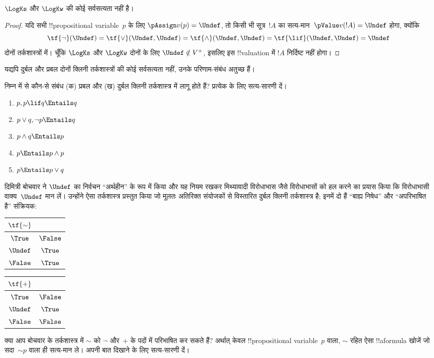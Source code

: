 \documentclass[../../../include/open-logic-section]{subfiles}
\begin{document}
\begin{prop}
  $\LogKs$ और $\LogKw$ की कोई सर्वसत्यता नहीं है।
\end{prop}

\begin{proof}
  यदि सभी !!{propositional variable}~$p$ के लिए $\pAssign v(p) =
  \Undef$, तो किसी भी सूत्र~$!A$ का सत्य-मान~$\pValue v(!A) = \Undef$
  होगा, क्योंकि
  \[
    \tf{\lnot}(\Undef) = \tf{\lor}(\Undef, \Undef) = \tf{\land}(\Undef,
  \Undef) = \tf{\lif}(\Undef, \Undef) = \Undef
  \]
  दोनों तर्कशास्त्रों में। चूँकि $\LogKs$ और $\LogKw$ दोनों के लिए $\Undef
  \notin V^+$, इसलिए इस !!{valuation} में $!A$ निर्दिष्ट नहीं होगा।
\end{proof}

यद्यपि दुर्बल और प्रबल दोनों क्लिनी तर्कशास्त्रों की कोई सर्वसत्यता नहीं,
उनके परिणाम-संबंध अतुच्छ हैं।

\begin{prob}
  निम्न में से कौन-से संबंध (क) प्रबल और (ख) दुर्बल क्लिनी तर्कशास्त्र में
  लागू होते हैं? प्रत्येक के लिए सत्य-सारणी दें।
  \begin{enumerate}
    \item $p, p \lif q \Entails q$
    \item $p \lor q, \lnot p \Entails q$
    \item $p \land q \Entails p$
    \item $p \Entails p \land p$
    \item $p \Entails p \lor q$
  \end{enumerate}
\end{prob}

दिमित्री बोचवार ने $\Undef$ का निर्वचन ``अर्थहीन'' के रूप में किया और यह
नियम रखकर मिथ्यावादी विरोधाभास जैसे विरोधाभासों को हल करने का प्रयास किया
कि विरोधाभासी वाक्य~$\Undef$ मान लें। उन्होंने ऐसा तर्कशास्त्र प्रस्तुत
किया जो मूलतः अतिरिक्त संयोजकों से विस्तारित दुर्बल क्लिनी तर्कशास्त्र है;
इनमें दो हैं ``बाह्य निषेध'' और ``अपरिभाषित है'' संक्रियक:
\begin{center}
  \begin{tabular}{c|c} 
    $\tf{\sim}$ & \\ 
    \hline  
    $\True$ & $\False$ \\ 
    $\Undef$ & $\True$ \\
    $\False$ & $\True$ 
  \end{tabular}
\quad
  \begin{tabular}{c|c} 
    $\tf{+}$ & \\ 
    \hline  
    $\True$ & $\False$ \\ 
    $\Undef$ & $\True$ \\
    $\False$ & $\False$ 
  \end{tabular}
\end{center}

\begin{prob}
  क्या आप बोचवार के तर्कशास्त्र में $\sim$ को $\lnot$ और~$+$ के पदों में
  परिभाषित कर सकते हैं? अर्थात् केवल !!{propositional variable}~$p$ वाला,
  $\sim$ रहित ऐसा !!a{formula} खोजें जो सदा~$\mathord{\sim}p$ वाला ही
  सत्य-मान ले। अपनी बात दिखाने के लिए सत्य-सारणी दें।
\end{prob}
\end{document}
